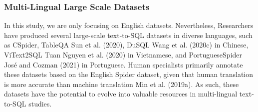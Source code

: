 \subsubsection{Multi-Lingual Large Scale Datasets}

In this study, we are only focusing on English datasets. Nevertheless, Researchers have produced several large-scale text-to-SQL datasets in diverse languages, such as CSpider\cite{min-etal-2019-pilot}, TableQA Sun et al. (2020)\cite[XXXX]{DBLP:journals/corr/abs-2006-06434}, DuSQL Wang et al. (2020c) \cite{wang-etal-2020-dusql} in Chinese, ViText2SQL Tuan Nguyen et al. (2020)\cite{tuan-nguyen-etal-2020-pilot} in Vietnamese, and PortugueseSpider José and Cozman (2021) in Portuguese\cite{DBLP:journals/corr/abs-2110-03546}. Human specialists primarily annotate these datasets based on the English Spider dataset, given that human translation is more accurate than machine translation Min et al. (2019a)\cite{min-etal-2019-pilot}. As such, these datasets have the potential to evolve into valuable resources in multi-lingual text-to-SQL studies.
